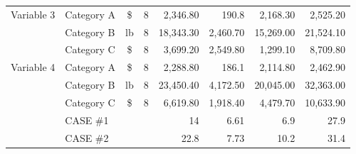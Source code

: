 \documentclass[11pt]{article}
\begin{document}
\begin{table}[H]
{\begin{tabular}{rlrrrrrr}
			\multicolumn{1}{l}{Variable 3}         & Category A                              & \multicolumn{1}{c}{\$}            & \multicolumn{1}{c}{8}            & 2,346.80                          & 190.8                                 & 2,168.30                         & 2,525.20                         \\
			                                       & Category B                              & \multicolumn{1}{c}{lb}            & \multicolumn{1}{c}{8}            & 18,343.30                         & 2,460.70                              & 15,269.00                        & 21,524.10                        \\
			                                       & Category C                              & \multicolumn{1}{c}{\$}            & \multicolumn{1}{c}{8}            & 3,699.20                          & 2,549.80                              & 1,299.10                         & 8,709.80                         \\
			\multicolumn{1}{l}{Variable 4}         & Category A                              & \multicolumn{1}{c}{\$}            & \multicolumn{1}{c}{8}            & 2,288.80                          & 186.1                                 & 2,114.80                         & 2,462.90                         \\
			                                       & Category B                              & \multicolumn{1}{c}{lb}            & \multicolumn{1}{c}{8}            & 23,450.40                         & 4,172.50                              & 20,045.00                        & 32,363.00                        \\
			                                       & Category C                              & \multicolumn{1}{c}{\$}            & \multicolumn{1}{c}{8}            & 6,619.80                          & 1,918.40                              & 4,479.70                         & 10,633.90                        \\
			\hline
			                                       & CASE \#1                                &                                   &                                  & 14                                & 6.61                                  & 6.9                              & 27.9                             \\
			                                       & CASE \#2                                &                                   &                                  & 22.8                              & 7.73                                  & 10.2                             & 31.4                             \\
			\hline
		\end{tabular}}
\end{table}%
\end{document}
